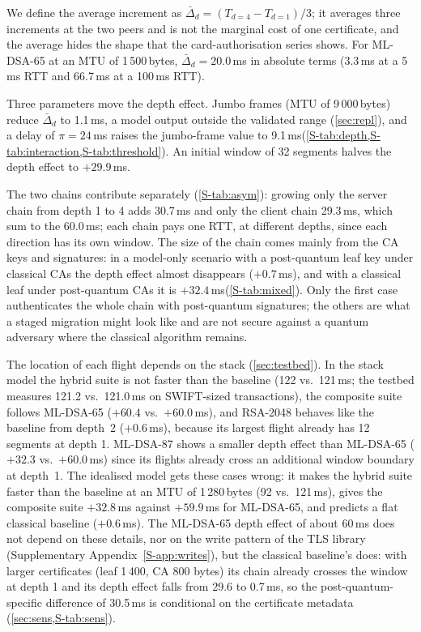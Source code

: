 \documentclass[preprint,12pt]{elsarticle}
\newcommand{\ms}{\,ms\xspace}
\begin{document}
We define the average increment as $\bar{\Delta}_d=(T_{d=4}-T_{d=1})/3$; it averages three increments at the two peers and is not the marginal cost of one certificate, and the average hides the shape that the card-authorisation series shows. For ML-DSA-65 at an MTU of 1\,500\,bytes, $\bar{\Delta}_d=20.0$\ms in absolute terms (3.3\ms at a 5\ms RTT and 66.7\ms at a 100\ms RTT).

Three parameters move the depth effect. Jumbo frames (MTU of 9\,000\,bytes) reduce $\bar{\Delta}_d$ to 1.1\ms, a model output outside the validated range (\cref{sec:repl}), and a delay of $\pi=24$\ms raises the jumbo-frame value to 9.1\ms (\cref{S-tab:depth,S-tab:interaction,S-tab:threshold}). An initial window of 32 segments halves the depth effect to $+29.9$\ms.

The two chains contribute separately (\cref{S-tab:asym}): growing only the server chain from depth 1 to 4 adds 30.7\ms and only the client chain 29.3\ms, which sum to the 60.0\ms; each chain pays one RTT, at different depths, since each direction has its own window. The size of the chain comes mainly from the CA keys and signatures: in a model-only scenario with a post-quantum leaf key under classical CAs the depth effect almost disappears ($+0.7$\ms), and with a classical leaf under post-quantum CAs it is $+32.4$\ms (\cref{S-tab:mixed}). Only the first case authenticates the whole chain with post-quantum signatures; the others are what a staged migration might look like and are not secure against a quantum adversary where the classical algorithm remains.

The location of each flight depends on the stack (\cref{sec:testbed}). In the stack model the hybrid suite is not faster than the baseline (122 vs.\ 121\ms; the testbed measures 121.2 vs.\ 121.0\ms on SWIFT-sized transactions), the composite suite follows ML-DSA-65 ($+60.4$ vs.\ $+60.0$\ms), and RSA-2048 behaves like the baseline from depth~2 ($+0.6$\ms), because its largest flight already has 12 segments at depth 1. ML-DSA-87 shows a smaller depth effect than ML-DSA-65 ($+32.3$ vs.\ $+60.0$\ms) since its flights already cross an additional window boundary at depth~1. The idealised model gets these cases wrong: it makes the hybrid suite faster than the baseline at an MTU of 1\,280\,bytes (92 vs.\ 121\ms), gives the composite suite $+32.8$\ms against $+59.9$\ms for ML-DSA-65, and predicts a flat classical baseline ($+0.6$\ms). The ML-DSA-65 depth effect of about 60\ms does not depend on these details, nor on the write pattern of the TLS library (Supplementary Appendix~\ref{S-app:writes}), but the classical baseline's does: with larger certificates (leaf 1\,400, CA 800 bytes) its chain already crosses the window at depth 1 and its depth effect falls from 29.6 to 0.7\ms, so the post-quantum-specific difference of 30.5\ms is conditional on the certificate metadata (\cref{sec:sens,S-tab:sens}).
\end{document}
